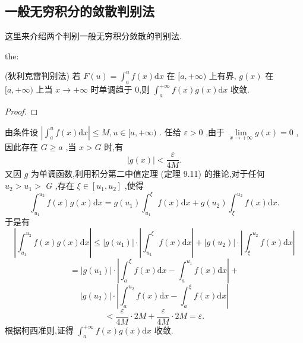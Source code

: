 \subsection{一般无穷积分的敛散判别法}

这里来介绍两个判别一般无穷积分敛散的判别法.

\begin{theorem}{}{the:}

\end{theorem}
 (狄利克雷判别法) 若 \(F\left( u\right)  = {\int }_{a}^{u}f\left( x\right) \mathrm{d}x\) 在 \(\lbrack a, + \infty )\) 上有界, \(g\left( x\right)\) 在 \(\lbrack a, + \infty )\) 上当 \(x \rightarrow   + \infty\) 时单调趋于 0,则 \({\int }_{a}^{+\infty }f\left( x\right) g\left( x\right) \mathrm{d}x\) 收敛.

\begin{proof}

\end{proof}
由条件设 \(\left| {{\int }_{a}^{u}f\left( x\right) \mathrm{d}x}\right|  \leq  M,u \in  \lbrack a, + \infty )\) . 任给 \(\varepsilon  > 0\) ,由于 \(\mathop{\lim }\limits_{{x \rightarrow   + \infty }}g\left( x\right)  = 0\) ,因此存在 \(G \geq  a\) ,当 \(x > G\) 时,有
\[
\left| {g\left( x\right) }\right|  < \frac{\varepsilon }{4M}.
\]
又因 \(g\) 为单调函数,利用积分第二中值定理 (定理 9.11) 的推论,对于任何 \({u}_{2} > {u}_{1} >\)  \(G\) ,存在 \(\xi  \in  \left\lbrack  {{u}_{1},{u}_{2}}\right\rbrack\) ,使得
\[
{\int }_{{u}_{1}}^{{u}_{2}}f\left( x\right) g\left( x\right) \mathrm{d}x = g\left( {u}_{1}\right) {\int }_{{u}_{1}}^{\xi }f\left( x\right) \mathrm{d}x + g\left( {u}_{2}\right) {\int }_{\xi }^{{u}_{2}}f\left( x\right) \mathrm{d}x.
\]
于是有
\[
\left| {{\int }_{{u}_{1}}^{{u}_{2}}f\left( x\right) g\left( x\right) \mathrm{d}x}\right|  \leq  \left| {g\left( {u}_{1}\right) }\right|  \cdot  \left| {{\int }_{{u}_{1}}^{\xi }f\left( x\right) \mathrm{d}x}\right|  + \left| {g\left( {u}_{2}\right) }\right|  \cdot  \left| {{\int }_{\xi }^{{u}_{2}}f\left( x\right) \mathrm{d}x}\right|
\]
\[
= \left| {g\left( {u}_{1}\right) }\right|  \cdot  \left| {{\int }_{a}^{\xi }f\left( x\right) \mathrm{d}x - {\int }_{a}^{{u}_{1}}f\left( x\right) \mathrm{d}x}\right|  +
\]
\[
\left| {g\left( {u}_{2}\right) }\right|  \cdot  \left| {{\int }_{a}^{{u}_{2}}f\left( x\right) \mathrm{d}x - {\int }_{a}^{\xi }f\left( x\right) \mathrm{d}x}\right|
\]
\[
< \frac{\varepsilon }{4M} \cdot  {2M} + \frac{\varepsilon }{4M} \cdot  {2M} = \varepsilon .
\]
根据柯西准则,证得 \({\int }_{a}^{+\infty }f\left( x\right) g\left( x\right) \mathrm{d}x\) 收敛.

